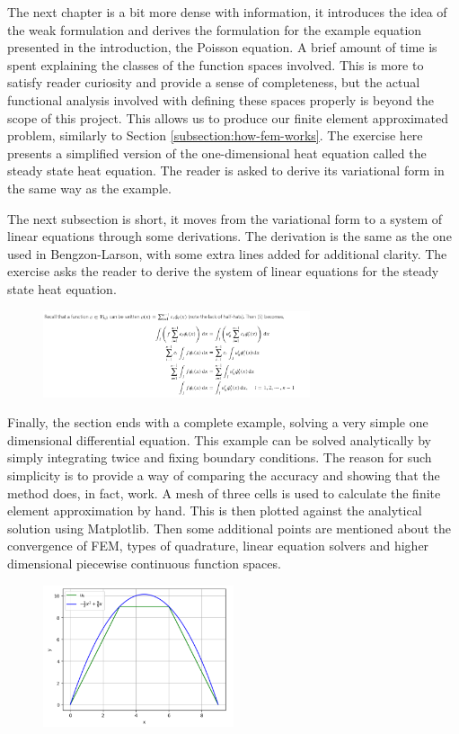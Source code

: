 The next chapter is a bit more dense with information, it introduces the idea of the weak formulation and derives the formulation for the example equation presented in the introduction, the Poisson equation. A brief amount of time is spent explaining the classes of the function spaces involved. This is more to satisfy reader curiosity and provide a sense of completeness, but the actual functional analysis involved with defining these spaces properly is beyond the scope of this project. This allows us to produce our finite element approximated problem, similarly to Section \ref{subsection:how-fem-works}. The exercise here presents a simplified version of the one-dimensional heat equation called the steady state heat equation. The reader is asked to derive its variational form in the same way as the example.

The next subsection is short, it moves from the variational form to a system of linear equations through some derivations. The derivation is the same as the one used in Bengzon-Larson, with some extra lines added for additional clarity. The exercise asks the reader to derive the system of linear equations for the steady state heat equation.

\begin{figure}[h]
\centering
\includegraphics[width=0.7\textwidth, frame]{./images/notebook2/2}
\end{figure}

Finally, the section ends with a complete example, solving a very simple one dimensional differential equation. This example can be solved analytically by simply integrating twice and fixing boundary conditions. The reason for such simplicity is to provide a way of comparing the accuracy and showing that the method does, in fact, work. A mesh of three cells is used to calculate the finite element approximation by hand. This is then plotted against the analytical solution using Matplotlib. Then some additional points are mentioned about the convergence of FEM, types of quadrature, linear equation solvers and higher dimensional piecewise continuous function spaces.

\begin{figure}[h]
\centering
\includegraphics[width=0.5\textwidth, frame]{./images/notebook2/3}
\end{figure}

